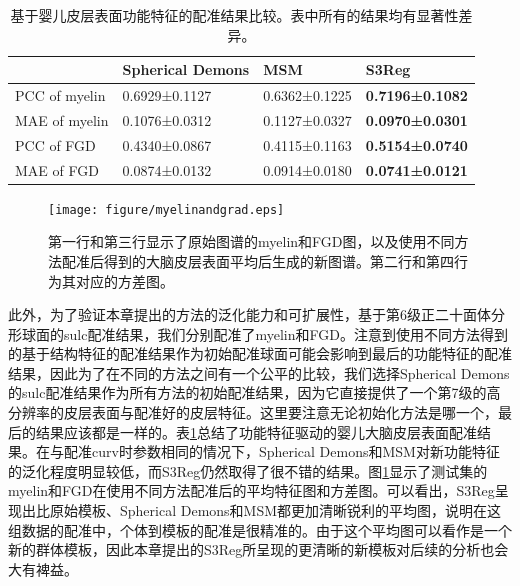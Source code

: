 \begin{table}[h]
		\caption{基于婴儿皮层表面功能特征的配准结果比较。表中所有的结果均有显著性差异。}
		\label{tab:婴儿皮层表面功能特征配准结果}
		\centering
		\begin{tabularx}{0.9\columnwidth}{X<{\centering}|X<{\centering}|X<{\centering}|X<{\centering}}
			\hline
			& Spherical Demons &	MSM	& S3Reg  \\
		    \hline
			PCC of myelin              &	0.6929±0.1127	 &  0.6362±0.1225 &	\textbf{0.7196±0.1082} \\
			MAE of myelin              &	0.1076±0.0312    &	0.1127±0.0327 &	\textbf{0.0970±0.0301} \\
			PCC of FGD    &	0.4340±0.0867    &	0.4115±0.1163 &	\textbf{0.5154±0.0740} \\
			MAE of FGD	   &    0.0874±0.0132    &	0.0914±0.0180 &	\textbf{0.0741±0.0121} \\	
			\hline
		\end{tabularx}
\end{table}

\begin{figure}[h]
	\centering
	\texttt{[image: figure/myelinandgrad.eps]}
	\caption{第一行和第三行显示了原始图谱的myelin和FGD图，以及使用不同方法配准后得到的大脑皮层表面平均后生成的新图谱。第二行和第四行为其对应的方差图。}
	\label{fig:myelinandgrad}
\end{figure}

此外，为了验证本章提出的方法的泛化能力和可扩展性，基于第6级正二十面体分形球面的sulc配准结果，我们分别配准了myelin和FGD。注意到使用不同方法得到的基于结构特征的配准结果作为初始配准球面可能会影响到最后的功能特征的配准结果，因此为了在不同的方法之间有一个公平的比较，我们选择Spherical Demons的sulc配准结果作为所有方法的初始配准结果，因为它直接提供了一个第7级的高分辨率的皮层表面与配准好的皮层特征。这里要注意无论初始化方法是哪一个，最后的结果应该都是一样的。表\ref{tab:婴儿皮层表面功能特征配准结果}总结了功能特征驱动的婴儿大脑皮层表面配准结果。在与配准curv时参数相同的情况下，Spherical Demons和MSM对新功能特征的泛化程度明显较低，而S3Reg仍然取得了很不错的结果。图\ref{fig:myelinandgrad}显示了测试集的myelin和FGD在使用不同方法配准后的平均特征图和方差图。可以看出，S3Reg呈现出比原始模板、Spherical Demons和MSM都更加清晰锐利的平均图，说明在这组数据的配准中，个体到模板的配准是很精准的。由于这个平均图可以看作是一个新的群体模板，因此本章提出的S3Reg所呈现的更清晰的新模板对后续的分析也会大有裨益。

